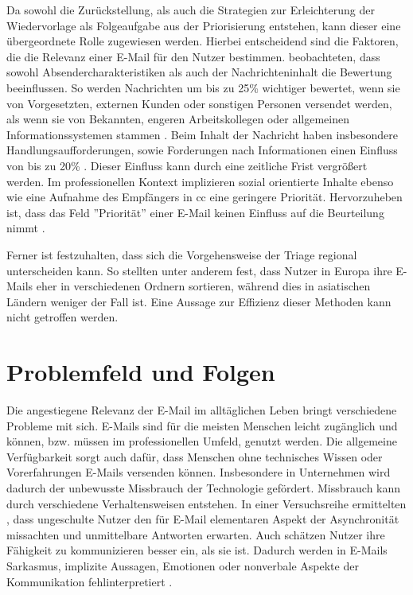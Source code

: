 Da sowohl die Zurückstellung, als auch die Strategien zur Erleichterung der Wiedervorlage als Folgeaufgabe aus der Priorisierung entstehen, kann dieser eine übergeordnete Rolle zugewiesen werden. Hierbei entscheidend sind die Faktoren, die die Relevanz einer E-Mail für den Nutzer bestimmen. \cite{Dabbish2005} beobachteten, dass sowohl Absendercharakteristiken als auch der Nachrichteninhalt die Bewertung beeinflussen. So werden Nachrichten um bis zu 25\% wichtiger bewertet, wenn sie von Vorgesetzten, externen Kunden oder sonstigen Personen versendet werden, als wenn sie von Bekannten, engeren Arbeitskollegen oder allgemeinen Informationssystemen stammen \citep[S. 698]{Dabbish2005}. Beim Inhalt der Nachricht haben insbesondere Handlungsaufforderungen, sowie Forderungen nach Informationen einen Einfluss von bis zu 20\% \citep[S. 696]{Dabbish2005}. Dieser Einfluss kann durch eine zeitliche Frist vergrößert werden. Im professionellen Kontext implizieren sozial orientierte Inhalte ebenso wie eine Aufnahme des Empfängers in \acrshort{cc} eine geringere Priorität. Hervorzuheben ist, dass das Feld ''Priorität'' einer E-Mail keinen Einfluss auf die Beurteilung nimmt \citep[S. 279 f.]{Whittaker1996}.

Ferner ist festzuhalten, dass sich die Vorgehensweise der Triage regional unterscheiden kann. So stellten \cite{Tang2009} unter anderem fest, dass Nutzer in Europa ihre E-Mails eher in verschiedenen Ordnern sortieren, während dies in asiatischen Ländern weniger der Fall ist. Eine Aussage zur Effizienz dieser Methoden kann nicht getroffen werden.

\newpage


\section{Problemfeld und Folgen}
\label{Problemfeld_und_Folgen}

Die angestiegene Relevanz der E-Mail im alltäglichen Leben bringt verschiedene Probleme mit sich. E-Mails sind für die meisten Menschen leicht zugänglich und können, bzw. müssen im professionellen Umfeld, genutzt werden. Die allgemeine Verfügbarkeit sorgt auch dafür, dass Menschen ohne technisches Wissen oder Vorerfahrungen E-Mails versenden können. Insbesondere in Unternehmen wird dadurch der unbewusste Missbrauch der Technologie gefördert. Missbrauch kann durch verschiedene Verhaltensweisen entstehen. In einer Versuchsreihe ermittelten \cite[S. 267]{Thomas2006}, dass ungeschulte Nutzer den für E-Mail elementaren Aspekt der Asynchronität missachten und unmittelbare Antworten erwarten. Auch schätzen Nutzer ihre Fähigkeit zu kommunizieren besser ein, als sie ist. Dadurch werden in E-Mails Sarkasmus, implizite Aussagen, Emotionen oder nonverbale Aspekte der Kommunikation fehlinterpretiert \citep[S. 933]{Kruger2005}.

